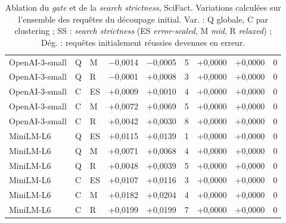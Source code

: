 \documentclass[a4paper,10pt]{article}
\begin{document}
\begin{table}[p]
\begin{tabular}{lllrrrrrr}
OpenAI-3-small & Q & M & $-$0,0014 & $-$0,0005 & 5 & +0,0000 & +0,0000 & 0 \\
OpenAI-3-small & Q & R & $-$0,0001 & +0,0008 & 3 & +0,0000 & +0,0000 & 0 \\
OpenAI-3-small & C & ES & +0,0009 & +0,0010 & 4 & +0,0000 & +0,0000 & 0 \\
OpenAI-3-small & C & M & +0,0072 & +0,0069 & 5 & +0,0000 & +0,0000 & 0 \\
OpenAI-3-small & C & R & +0,0042 & +0,0030 & 8 & +0,0000 & +0,0000 & 0 \\
\midrule
MiniLM-L6 & Q & ES & +0,0115 & +0,0139 & 1 & +0,0000 & +0,0000 & 0 \\
MiniLM-L6 & Q & M & +0,0071 & +0,0068 & 4 & +0,0000 & +0,0000 & 0 \\
MiniLM-L6 & Q & R & +0,0048 & +0,0039 & 5 & +0,0000 & +0,0000 & 0 \\
MiniLM-L6 & C & ES & +0,0107 & +0,0116 & 3 & +0,0000 & +0,0000 & 0 \\
MiniLM-L6 & C & M & +0,0182 & +0,0204 & 4 & +0,0000 & +0,0000 & 0 \\
MiniLM-L6 & C & R & +0,0199 & +0,0199 & 7 & +0,0000 & +0,0000 & 0 \\
\bottomrule
\end{tabular}
\caption{Ablation du \textit{gate} et de la \textit{search strictness}, SciFact. Variations calculées sur l'ensemble des requêtes du découpage initial. Var. : Q globale, C par clustering ; SS : \textit{search strictness} (ES \textit{error-scaled}, M \textit{mid}, R \textit{relaxed}) ; Dég. : requêtes initialement réussies devenues en erreur.}
\label{tab:s-ablation-scifact}
\end{table}
\end{document}
